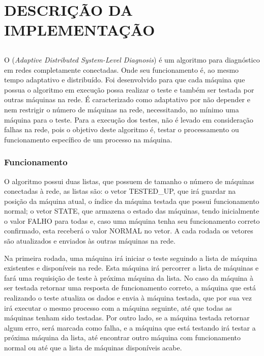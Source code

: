 
\chapter{DESCRIÇÃO DA IMPLEMENTAÇÃO}
\label{chap:descricao_da_implementacao}

\section{\adaptive{}}
\label{sec:adaptiveDSD}

O \adaptive (\textit{Adaptive Distributed System-Level Diagnosis}) é um algoritmo para diagnóstico em redes completamente conectadas. Onde seu funcionamento é, ao mesmo tempo 
adaptativo e distribuído. Foi desenvolvido para que cada máquina que possua o algoritmo em execução possa realizar o teste e também ser testada por outras máquinas na rede.
É caracterizado como adaptativo por não depender e nem restrigir o número de máquinas na rede, necessitando, no mínimo uma máquina para o teste. Para a execução dos testes, não é levado
em consideração falhas na rede, pois o objetivo deste algoritmo é, testar o processamento ou funcionamento específico de um processo na máquina.

\subsection{Funcionamento}
\label{sub:adaptiveDSD_Funcionamento}
O algoritmo possui duas listas, que possuem de tamanho o número de máquinas conectadas à rede, as listas são: o vetor TESTED\_UP, que irá guardar na posição da máquina atual, 
o índice da máquina testada que possui funcionamento normal; o vetor STATE, que armazena o estado das máquinas, tendo inicialmente o valor FALHO para todas e, caso uma máquina tenha seu 
funcionamento correto confirmado, esta receberá o valor NORMAL no vetor. A cada rodada os vetores são atualizados e enviados às outras máquinas na rede.

Na primeira rodada, uma máquina irá iniciar o teste seguindo a lista de máquina existentes e disponíveis na rede. Esta máquina irá percorrer a
lista de máquinas e fará uma requisição de teste à próxima máquina da lista. No caso da máquina à ser testada retornar uma resposta de funcionamento correto, a máquina que está realizando o 
teste atualiza os dados e envia à máquina testada, que por sua vez irá executar o mesmo processo com a máquina seguinte, até que todas as máquinas tenham sido testadas. Por outro lado, se 
a máquina testada retornar algum erro, será marcada como falha, e a máquina que está testando irá testar a próxima máquina da lista, até encontrar outro máquina com funcionamento normal 
ou até que a lista de máquinas disponíveis acabe.

